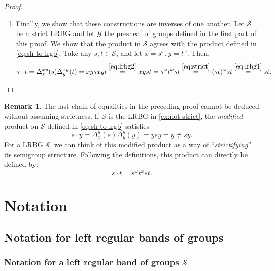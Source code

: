 \documentclass[11pt, oneside, reqno]{amsart}
\theoremstyle{definition}
\newtheorem{remark}[theorem]{Remark}
\numberwithin{equation}{section}
\def \GG{{\mathcal{G}}}
\def \SS{{\mathcal{S}}}
\begin{document}
\begin{proof}
\begin{enumerate}[wide]
    \item
    Finally, we show that these constructions are inverses of one another.
    Let $\SS$ be a strict LRBG and let $\GG$ the presheaf of groups defined in
    the first part of this proof.
    We show that the product in $\SS$ agrees with the product defined in \cref{eq:sh-to-lrgb}.
    Take any $s,t \in \SS$, and let $x = s^\omega, y = t^\omega$. Then,
    \[
        s \cdot t =
        \Delta_x^{xy}(s) \Delta_y^{xy}(t) = xys xyt
        \overset{\cref{eq:lrbg2}}{=}
        xy st
        =
        s^\omega t^\omega s t
        \overset{\cref{eq:strict}}{=}
        (st)^\omega st
        \overset{\cref{eq:lrbg1}}{=}
        st.
        \qedhere
    \]
    \end{enumerate}
 \end{proof}

\begin{remark}
    The last chain of equalities in the preceding proof cannot be deduced without assuming strictness.
    If $\SS$ is the LRBG in \cref{ex:not-strict}, the {\em modified} product on $\SS$
    defined in \cref{eq:sh-to-lrgb} satisfies
    \[
        s \cdot y = \Delta_{x}^{y}(s) \Delta_y^y(y) = ysy = y \neq s y.
    \]
    For a LRBG $\SS$, we can think of this modified product as a way of ``\emph{strictifying}'' its semigroup structure.
    Following the definitions, this product can directly be defined by:
    \[  s \cdot t = s^\omega t^\omega s t. \]
\end{remark}



\newpage

\section{Notation}

\subsection*{Notation for left regular bands of groups}

\subsubsection*{Notation for a left regular band of groups $\SS$}
\end{document}
